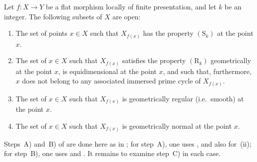 \begin{theorem}[12.1.6]
\label{IV.12.1.6}
Let $f:X\to Y$ be a flat morphism locally of finite presentation, and let $k$ be an integer.
The following subsets of $X$ are open:
\begin{enumerate}[label=(\roman*)]
  \item The set of points $x\in X$ such that $X_{f(x)}$ has the property $(\mathrm{S}_k)$ at the point $x$.
  \item The set of $x\in X$ such that $X_{f(x)}$ satisfies the property $(\mathrm{R}_k)$ geometrically at the point $x$, is equidimensional at the point $x$, and such that, furthermore, $x$ does not belong to any associated immersed prime cycle of $X_{f(x)}$.
  \item The set of $x\in X$ such that $X_{f(x)}$ is geometrically regular (i.e.\ smooth) at the point $x$.
  \item The set of $x\in X$ such that $X_{f(x)}$ is geometrically normal at the point $x$.
\end{enumerate}

Steps~A) and~B) of  are done here as in ; for step~A), one uses , and also  for~(ii); for step~B), one uses  and .
It remains to examine step~C) in each case.
\end{theorem}

